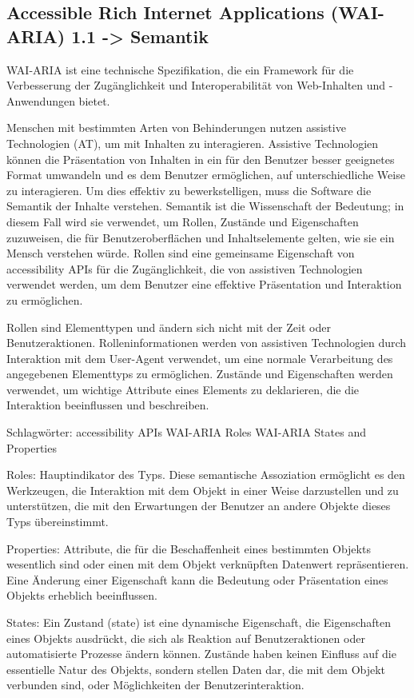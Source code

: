 \subsection{Accessible Rich Internet Applications (WAI-ARIA) 1.1 -> Semantik}

WAI-ARIA ist eine technische Spezifikation, die ein Framework für die Verbesserung der Zugänglichkeit und Interoperabilität von Web-Inhalten und -Anwendungen bietet.

Menschen mit bestimmten Arten von Behinderungen nutzen assistive Technologien (AT), um mit Inhalten zu interagieren. Assistive Technologien können die Präsentation von Inhalten in ein für den Benutzer besser geeignetes Format umwandeln und es dem Benutzer ermöglichen, auf unterschiedliche Weise zu interagieren. Um dies effektiv zu bewerkstelligen, muss die Software die Semantik der Inhalte verstehen. Semantik ist die Wissenschaft der Bedeutung; in diesem Fall wird sie verwendet, um Rollen, Zustände und Eigenschaften zuzuweisen, die für Benutzeroberflächen und Inhaltselemente gelten, wie sie ein Mensch verstehen würde. Rollen sind eine gemeinsame Eigenschaft von accessibility APIs für die Zugänglichkeit, die von assistiven Technologien verwendet werden, um dem Benutzer eine effektive Präsentation und Interaktion zu ermöglichen.

Rollen sind Elementtypen und ändern sich nicht mit der Zeit oder Benutzeraktionen. Rolleninformationen werden von assistiven Technologien durch Interaktion mit dem User-Agent verwendet, um eine normale Verarbeitung des angegebenen Elementtyps zu ermöglichen. Zustände und Eigenschaften werden verwendet, um wichtige Attribute eines Elements zu deklarieren, die die Interaktion beeinflussen und beschreiben. 

Schlagwörter:
accessibility APIs
WAI-ARIA Roles
WAI-ARIA States and Properties

Roles:
Hauptindikator des Typs. Diese semantische Assoziation ermöglicht es den Werkzeugen, die Interaktion mit dem Objekt in einer Weise darzustellen und zu unterstützen, die mit den Erwartungen der Benutzer an andere Objekte dieses Typs übereinstimmt.

Properties:
Attribute, die für die Beschaffenheit eines bestimmten Objekts wesentlich sind oder einen mit dem Objekt verknüpften Datenwert repräsentieren. Eine Änderung einer Eigenschaft kann die Bedeutung oder Präsentation eines Objekts erheblich beeinflussen.


States:
Ein Zustand (state) ist eine dynamische Eigenschaft, die Eigenschaften eines Objekts ausdrückt, die sich als Reaktion auf Benutzeraktionen oder automatisierte Prozesse ändern können. Zustände haben keinen Einfluss auf die essentielle Natur des Objekts, sondern stellen Daten dar, die mit dem Objekt verbunden sind, oder Möglichkeiten der Benutzerinteraktion.

